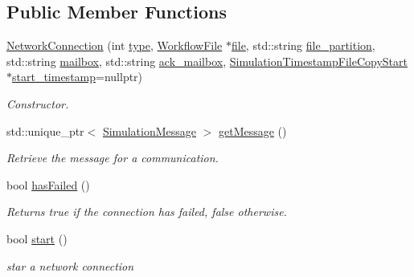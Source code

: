 \subsection*{Public Member Functions}
\begin{DoxyCompactItemize}
\item 
\hyperlink{classwrench_1_1_network_connection_aab9a8f00fd9cc8d7504a03bfbe777686}{Network\+Connection} (int \hyperlink{classwrench_1_1_network_connection_ae877c47cb51d7b4c3e90874ec5a8b51f}{type}, \hyperlink{classwrench_1_1_workflow_file}{Workflow\+File} $\ast$\hyperlink{classwrench_1_1_network_connection_af0885a0be98dc068805adf6a53ace993}{file}, std\+::string \hyperlink{classwrench_1_1_network_connection_aceed24007ae63b2e2a1628663414dc49}{file\+\_\+partition}, std\+::string \hyperlink{classwrench_1_1_network_connection_a7664761ff6891e9657c183d0c1489d18}{mailbox}, std\+::string \hyperlink{classwrench_1_1_network_connection_a4e3dbf246b8eda864e7fed9900e93471}{ack\+\_\+mailbox}, \hyperlink{classwrench_1_1_simulation_timestamp_file_copy_start}{Simulation\+Timestamp\+File\+Copy\+Start} $\ast$\hyperlink{classwrench_1_1_network_connection_ad597f7dda3e3b7875c9030086aaeda46}{start\+\_\+timestamp}=nullptr)
\begin{DoxyCompactList}\small\item\em Constructor. \end{DoxyCompactList}\item 
std\+::unique\+\_\+ptr$<$ \hyperlink{classwrench_1_1_simulation_message}{Simulation\+Message} $>$ \hyperlink{classwrench_1_1_network_connection_a4d17be0643165325bf8f2b83bf1e64a3}{get\+Message} ()
\begin{DoxyCompactList}\small\item\em Retrieve the message for a communication. \end{DoxyCompactList}\item 
bool \hyperlink{classwrench_1_1_network_connection_a23c3623053c93250d5b57b331a49e8eb}{has\+Failed} ()
\begin{DoxyCompactList}\small\item\em Returns true if the connection has failed, false otherwise. \end{DoxyCompactList}\item 
bool \hyperlink{classwrench_1_1_network_connection_a60eb6e8c18895c69e0b744b8230b5471}{start} ()
\begin{DoxyCompactList}\small\item\em star a network connection \end{DoxyCompactList}\end{DoxyCompactItemize}
